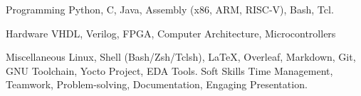 

\begin{cvskills}

  \cvskill
    {Programming} %
    {Python, C, Java, Assembly (x86, ARM, RISC-V), Bash, Tcl.} %
    
  \cvskill
    {Hardware} %
    {VHDL, Verilog, FPGA, Computer Architecture, Microcontrollers} %

  \cvskill
    {Miscellaneous} %
    {Linux, Shell (Bash/Zsh/Tclsh), \LaTeX, Overleaf, Markdown, Git, GNU Toolchain, Yocto Project, EDA Tools.} %
  \cvskill
    {Soft Skills} %
    {Time Management, Teamwork, Problem-solving, Documentation, Engaging Presentation.} %

\end{cvskills}
